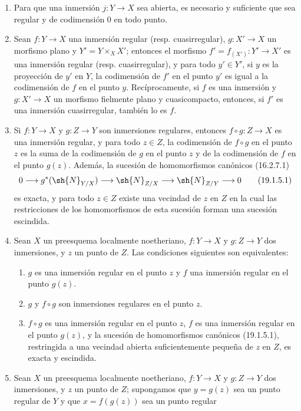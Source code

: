 \begin{proposition}[19.1.5]
\label{IV.19.1.5}
\begin{enumerate}
  \item[\textup{(i)}] Para que una inmersión $j:Y\to X$ sea abierta, es necesario y suficiente que sea regular y de codimensión $0$ en todo punto.
  \item[\textup{(ii)}] Sean $f:Y\to X$ una inmersión regular \textup{(resp.} cuasirregular\textup{)}, $g:X'\to X$ un morfismo plano y $Y'=Y\times_X X'$; entonces el morfismo $f'=f_{(X')}:Y'\to X'$ es una inmersión regular \textup{(resp.} cuasirregular\textup{)}, y para todo $y'\in Y'$, si $y$ es la proyección de $y'$ en $Y$, la codimensión de $f'$ en el punto $y'$ es igual a la codimensión de $f$ en el punto $y$. Recíprocamente, si $f$ es una inmersión y $g:X'\to X$ un morfismo fielmente plano y cuasicompacto, entonces, si $f'$ es una inmersión cuasirregular, también lo es $f$.
  \item[\textup{(iii)}] Si $f:Y\to X$ y $g:Z\to Y$ son inmersiones regulares, entonces $f\circ g:Z\to X$ es una inmersión regular, y para todo $z\in Z$, la codimensión de $f\circ g$ en el punto $z$ es la suma de la codimensión de $g$ en el punto $z$ y de la codimensión de $f$ en el punto $g(z)$. Además, la sucesión de homomorfismos canónicos \textup{(16.2.7.1)}
\begin{equation}
  0\longrightarrow g^*(\sh{N}_{Y/X})\longrightarrow\sh{N}_{Z/X}\longrightarrow\sh{N}_{Z/Y}\longrightarrow0
  \tag{19.1.5.1}\label{IV.19.1.5.1}
\end{equation}
es exacta, y para todo $z\in Z$ existe una vecindad de $z$ en $Z$ en la cual las restricciones de los homomorfismos de esta sucesión forman una sucesión escindida.
  \item[\textup{(iv)}] Sean $X$ un preesquema localmente noetheriano, $f:Y\to X$ y $g:Z\to Y$ dos inmersiones, y $z$ un punto de $Z$. Las condiciones siguientes son equivalentes:
  \begin{enumerate}
    \item[\textup{a)}] $g$ es una inmersión regular en el punto $z$ y $f$ una inmersión regular en el punto $g(z)$.
    \item[\textup{b)}] $g$ y $f\circ g$ son inmersiones regulares en el punto $z$.
    \item[\textup{c)}] $f\circ g$ es una inmersión regular en el punto $z$, $f$ es una inmersión regular en el punto $g(z)$, y la sucesión de homomorfismos canónicos \textup{(19.1.5.1)}, restringida a una vecindad abierta suficientemente pequeña de $z$ en $Z$, es exacta y escindida.
  \end{enumerate}
  \item[\textup{(v)}] Sean $X$ un preesquema localmente noetheriano, $f:Y\to X$ y $g:Z\to Y$ dos inmersiones, y $z$ un punto de $Z$; supongamos que $y=g(z)$ sea un punto regular de $Y$ y que $x=f(g(z))$ sea un punto regular




\end{enumerate}
\end{proposition}
